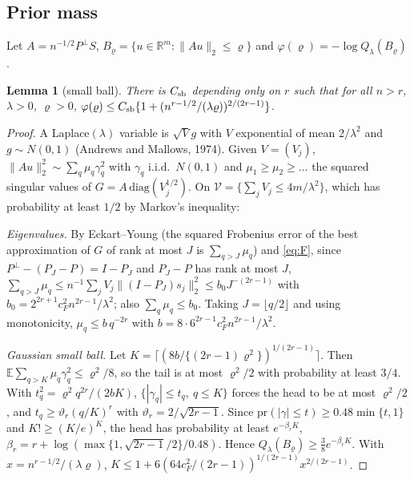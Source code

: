 \documentclass[11pt]{article}
\newtheorem{lemma}{Lemma}
\theoremstyle{definition}
\theoremstyle{remark}
\newcommand{\R}{\mathbb{R}}
\newcommand{\E}{\mathbb{E}}
\newcommand{\pr}{\mathrm{pr}}
\newcommand{\Ql}{Q_\lambda}
\newcommand{\Pp}{P^{\perp}}
\begin{document}
\subsection{Prior mass}

Let $A=n^{-1/2}\Pp S$, $B_\varrho=\{u\in\R^m:\|Au\|_2\le\varrho\}$ and $\varphi(\varrho)=-\log\Ql(B_\varrho)$.

\begin{lemma}[small ball]\label{lem:sb}
There is $C_{\rm sb}$ depending only on $r$ such that for all $n>r$, $\lambda>0$, $\varrho>0$,
$\varphi(\varrho)\le C_{\rm sb}\{1+(n^{r-1/2}/(\lambda\varrho))^{2/(2r-1)}\}$.
\end{lemma}

\begin{proof}
A Laplace$(\lambda)$ variable is $\sqrt Vg$ with $V$ exponential of mean $2/\lambda^2$ and $g\sim N(0,1)$ (Andrews and Mallows, 1974). Given $V=(V_j)$, $\|Au\|_2^2\sim\sum_q\mu_q\gamma_q^2$ with $\gamma_q$ i.i.d.\ $N(0,1)$ and $\mu_1\ge\mu_2\ge\dots$ the squared singular values of $G=A\,\mathrm{diag}(V_j^{1/2})$. On $\mathcal V=\{\sum_jV_j\le4m/\lambda^2\}$, which has probability at least $1/2$ by Markov's inequality:

\emph{Eigenvalues.} By Eckart--Young (the squared Frobenius error of the best approximation of $G$ of rank at most $J$ is $\sum_{q>J}\mu_q$) and \eqref{eq:F}, since $\Pp-(P_J-P)=I-P_J$ and $P_J-P$ has rank at most $J$,
$\sum_{q>J}\mu_q\le n^{-1}\sum_jV_j\|(I-P_J)s_j\|_2^2\le b_0J^{-(2r-1)}$ with $b_0=2^{2r+1}c_F^2n^{2r-1}/\lambda^2$; also $\sum_q\mu_q\le b_0$. Taking $J=\lfloor q/2\rfloor$ and using monotonicity, $\mu_q\le b\,q^{-2r}$ with $b=8\cdot6^{2r-1}c_F^2n^{2r-1}/\lambda^2$.

\emph{Gaussian small ball.} Let $K=\lceil(8b/\{(2r-1)\varrho^2\})^{1/(2r-1)}\rceil$. Then $\E\sum_{q>K}\mu_q\gamma_q^2\le\varrho^2/8$, so the tail is at most $\varrho^2/2$ with probability at least $3/4$. With $t_q^2=\varrho^2q^{2r}/(2bK)$, $\{|\gamma_q|\le t_q,\ q\le K\}$ forces the head to be at most $\varrho^2/2$, and $t_q\ge\vartheta_r(q/K)^r$ with $\vartheta_r=2/\sqrt{2r-1}$. Since $\pr(|\gamma|\le t)\ge0.48\min\{t,1\}$ and $K!\ge(K/e)^K$, the head has probability at least $e^{-\beta_rK}$, $\beta_r=r+\log(\max\{1,\sqrt{2r-1}/2\}/0.48)$. Hence $\Ql(B_\varrho)\ge\tfrac38e^{-\beta_rK}$. With $x=n^{r-1/2}/(\lambda\varrho)$, $K\le1+6(64c_F^2/(2r-1))^{1/(2r-1)}x^{2/(2r-1)}$.
\end{proof}
\end{document}
